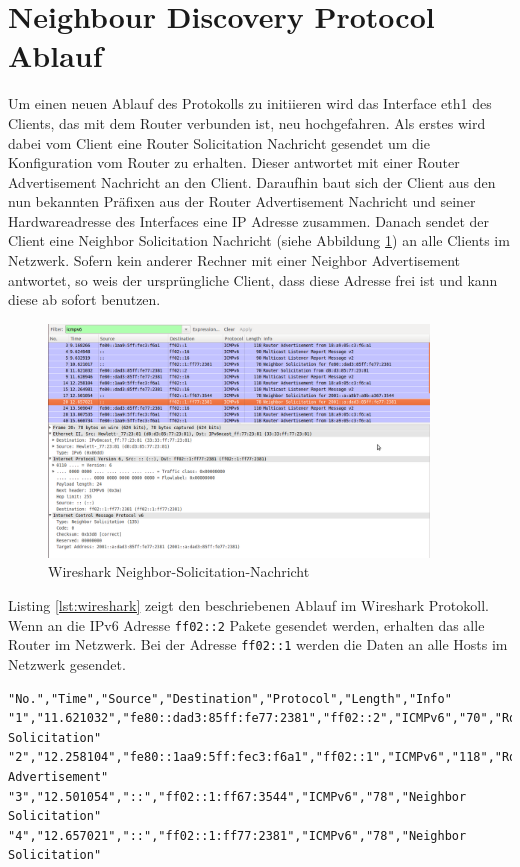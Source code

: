 \documentclass[a4paper,12pt]{article} %
\begin{document}
\section{Neighbour Discovery Protocol Ablauf}
Um einen neuen Ablauf des Protokolls zu initiieren wird das Interface eth1 des Clients, das mit dem Router verbunden ist, neu hochgefahren. Als erstes wird dabei vom Client eine Router Solicitation Nachricht gesendet um die Konfiguration vom Router zu erhalten. Dieser antwortet mit einer Router Advertisement Nachricht an den Client. Daraufhin baut sich der Client aus den nun bekannten Präfixen aus der Router Advertisement Nachricht und seiner Hardwareadresse des Interfaces eine IP Adresse zusammen. Danach sendet der Client eine Neighbor Solicitation Nachricht (siehe Abbildung \ref{fig:wireshark:neighbor-solicitation}) an alle Clients im Netzwerk. Sofern kein anderer Rechner mit einer Neighbor Advertisement antwortet, so weis der ursprüngliche Client, dass diese Adresse frei ist und kann diese ab sofort benutzen.

\begin{figure}[H]
	\centering
		\includegraphics[width=0.90\textwidth]{img/wireshark-neighbor-solicitation.png}
	\caption{Wireshark Neighbor-Solicitation-Nachricht}
	\label{fig:wireshark:neighbor-solicitation}
\end{figure}

Listing \ref{lst:wireshark} zeigt den beschriebenen Ablauf im Wireshark Protokoll. Wenn an die IPv6 Adresse \verb!ff02::2! Pakete gesendet werden, erhalten das alle Router im Netzwerk. Bei der Adresse \verb!ff02::1! werden die Daten an alle Hosts im Netzwerk gesendet.

\begin{lstlisting}[style=code,caption={Wireshark},label=lst:wireshark]
"No.","Time","Source","Destination","Protocol","Length","Info"
"1","11.621032","fe80::dad3:85ff:fe77:2381","ff02::2","ICMPv6","70","Router Solicitation"
"2","12.258104","fe80::1aa9:5ff:fec3:f6a1","ff02::1","ICMPv6","118","Router Advertisement"
"3","12.501054","::","ff02::1:ff67:3544","ICMPv6","78","Neighbor Solicitation"
"4","12.657021","::","ff02::1:ff77:2381","ICMPv6","78","Neighbor Solicitation"
\end{lstlisting}
\end{document}
